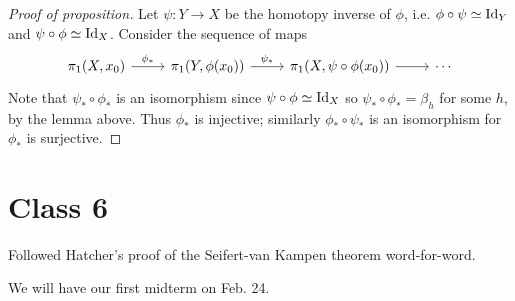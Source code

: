 \documentclass{../mathnotes}
\begin{document}
\begin{proof}[Proof of proposition]
    Let $\psi:Y\to X$ be the homotopy inverse of $\phi$, i.e. $\phi\circ\psi\simeq\operatorname{Id}_Y$ and $\psi\circ\phi\simeq\operatorname{Id}_X$.
    Consider the sequence of maps
    \begin{equation*}
        \begin{tikzcd}
            \pi_1(X,x_0)\arrow{r}{\phi_*}&\pi_1(Y,\phi(x_0))\arrow{r}{\psi_*}&\pi_1(X,\psi\circ\phi(x_0))\arrow{r}&\cdots
        \end{tikzcd}
    \end{equation*}
    Note that $\psi_*\circ\phi_*$ is an isomorphism since $\psi\circ\phi\simeq\operatorname{Id}_X$ so $\psi_*\circ\phi_*=\beta_h$
    for some $h$, by the lemma above. Thus $\phi_*$ is injective; similarly $\phi_*\circ\psi_*$ is an isomorphism
    for $\phi_*$ is surjective.
\end{proof}

\section*{Class 6}

Followed Hatcher's proof of the Seifert-van Kampen theorem word-for-word.
\begin{rem}
    We will have our first midterm on Feb. 24.
\end{rem}
\end{document}
